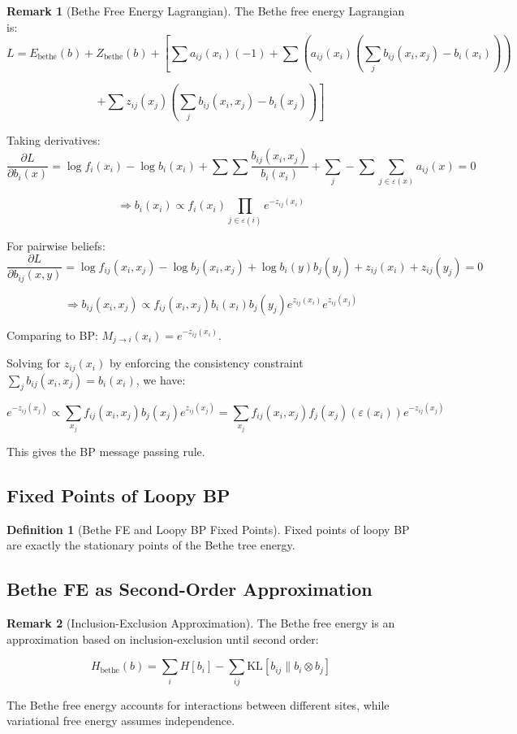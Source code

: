 \documentclass[12pt,a4paper]{article}
\theoremstyle{definition}
\newtheorem{definition}{Definition}[section]
\newtheorem{remark}{Remark}[section]
\begin{document}
\begin{remark}[Bethe Free Energy Lagrangian]
The Bethe free energy Lagrangian is:
\[
L = E_{\text{bethe}}(b) + Z_{\text{bethe}}(b) + \left[ \sum a_{ij}(x_i)(-1) + \sum \left( a_{ij}(x_i) \left( \sum_j b_{ij}(x_i, x_j) - b_i(x_i) \right) \right) \right.
\]

\[
\left. + \sum z_{ij}(x_j) \left( \sum_j b_{ij}(x_i, x_j) - b_i(x_j) \right) \right]
\]

Taking derivatives:
\[
\frac{\partial L}{\partial b_i(x)} = \log f_i(x_i) - \log b_i(x_i) + \sum \sum \frac{b_{ij}(x_i, x_j)}{b_i(x_i)} + \sum_j - \sum \sum_{j \in \varepsilon(x)} a_{ij}(x) = 0
\]

\[
\Rightarrow b_i(x_i) \propto f_i(x_i) \prod_{j \in \varepsilon(i)} e^{-z_{ij}(x_i)}
\]

For pairwise beliefs:
\[
\frac{\partial L}{\partial b_{ij}(x, y)} = \log f_{ij}(x_i, x_j) - \log b_j(x_i, x_j) + \log b_i(y) b_j(y_j) + z_{ij}(x_i) + z_{ij}(y_j) = 0
\]

\[
\Rightarrow b_{ij}(x_i, x_j) \propto f_{ij}(x_i, x_j) b_i(x_i) b_j(y_j) e^{z_{ij}(x_i)} e^{z_{ij}(x_j)}
\]

Comparing to BP: $M_{j \to i}(x_i) = e^{-z_{ij}(x_i)}$.

Solving for $z_{ij}(x_i)$ by enforcing the consistency constraint $\sum_j b_{ij}(x_i, x_j) = b_i(x_i)$, we have:

\[
e^{-z_{ij}(x_j)} \propto \sum_{x_j} f_{ij}(x_i, x_j) b_j(x_j) e^{z_{ij}(x_j)} = \sum_{x_j} f_{ij}(x_i, x_j) f_j(x_j) (\varepsilon(x_i)) e^{-z_{ij}(x_j)}
\]

This gives the BP message passing rule.
\end{remark}

\subsection{Fixed Points of Loopy BP}

\begin{definition}[Bethe FE and Loopy BP Fixed Points]
Fixed points of loopy BP are exactly the stationary points of the Bethe tree energy.
\end{definition}

\subsection{Bethe FE as Second-Order Approximation}

\begin{remark}[Inclusion-Exclusion Approximation]
The Bethe free energy is an approximation based on inclusion-exclusion until second order:

\[
H_{\text{bethe}}(b) = \sum_i H[b_i] - \sum_{ij} \text{KL}[b_{ij} \| b_i \otimes b_j]
\]

The Bethe free energy accounts for interactions between different sites, while variational free energy assumes independence.
\end{remark}
\end{document}
